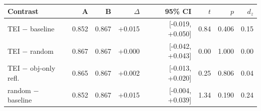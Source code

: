 \begin{tabular}{lrrrrrrr}
\toprule
Contrast & A & B & $\Delta$ & 95\% CI & $t$ & $p$ & $d_z$ \\
\midrule
TEI $-$ baseline & 0.852 & 0.867 & +0.015 & [-0.019, +0.050] & 0.84 & 0.406 & 0.15 \\
TEI $-$ random & 0.867 & 0.867 & +0.000 & [-0.042, +0.043] & 0.00 & 1.000 & 0.00 \\
TEI $-$ obj-only refl. & 0.865 & 0.867 & +0.002 & [-0.013, +0.020] & 0.25 & 0.806 & 0.04 \\
random $-$ baseline & 0.852 & 0.867 & +0.015 & [-0.004, +0.039] & 1.34 & 0.190 & 0.24 \\
\bottomrule
\end{tabular}